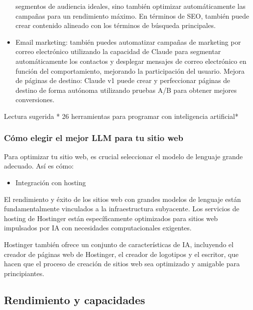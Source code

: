 \documentclass[a4paper12pt]{article}
\providecommand{\tightlist}{%
      \setlength{\itemsep}{0pt}\setlength{\parskip}{0pt}}
\begin{document}
\begin{itemize}
  segmentos de audiencia ideales, sino también optimizar automáticamente
  las campañas para un rendimiento máximo. En términos de SEO, también
  puede crear contenido alineado con los términos de búsqueda
  principales.
\item
  Email marketing: también puedes automatizar campañas de marketing por
  correo electrónico utilizando la capacidad de Claude para segmentar
  automáticamente los contactos y desplegar mensajes de correo
  electrónico en función del comportamiento, mejorando la participación
  del usuario. Mejora de páginas de destino: Claude v1 puede crear y
  perfeccionar páginas de destino de forma autónoma utilizando pruebas
  A/B para obtener mejores conversiones.
\end{itemize}

Lectura sugerida * 26 herramientas para programar con inteligencia
artificial*

\hypertarget{cuxf3mo-elegir-el-mejor-llm-para-tu-sitio-web}{%
\subsubsection{Cómo elegir el mejor LLM para tu sitio
web}\label{cuxf3mo-elegir-el-mejor-llm-para-tu-sitio-web}}

Para optimizar tu sitio web, es crucial seleccionar el modelo de
lenguaje grande adecuado. Así es cómo:

\begin{itemize}
\tightlist
\item
  Integración con hosting
\end{itemize}

El rendimiento y éxito de los sitios web con grandes modelos de lenguaje
están fundamentalmente vinculados a la infraestructura subyacente. Los
servicios de hosting de Hostinger están específicamente optimizados para
sitios web impulsados por IA con necesidades computacionales exigentes.

Hostinger también ofrece un conjunto de características de IA,
incluyendo el creador de páginas web de Hostinger, el creador de
logotipos y el escritor, que hacen que el proceso de creación de sitios
web sea optimizado y amigable para principiantes.

    \hypertarget{rendimiento-y-capacidades}{%
\subsection{Rendimiento y capacidades}\label{rendimiento-y-capacidades}}
\end{document}
